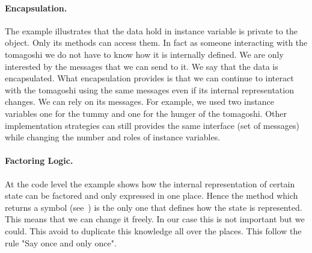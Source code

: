 \paragraph{Encapsulation.} The example illustrates that the data hold in instance variable is private to the object. Only its methods can access them. In fact as someone interacting with the tomagoshi we do not have to know how it is internally defined. We are only interested by the messages that we can send to it. We say that the data is encapsulated. What encapsulation provides is that we can continue to interact with the
tomagoshi using the same messages even if its internal representation changes. We can rely on its messages.
For example, we used two instance variables one for the tummy and one for the hunger of the tomagoshi. Other implementation strategies can still provides the same interface (set of messages) while changing the number and roles of instance variables. 


\paragraph{Factoring Logic.}
At the code level the example shows how the internal representation of certain state can be factored and only expressed in one place. Hence the method  which returns a symbol (see~) is the only one that defines how the state is represented. This means that we can change it freely. In our case this is not important but we could. This avoid to duplicate this knowledge all over the places. This follow the rule "Say once and only once". 












\ifx\wholebook\relax\else
\fi
